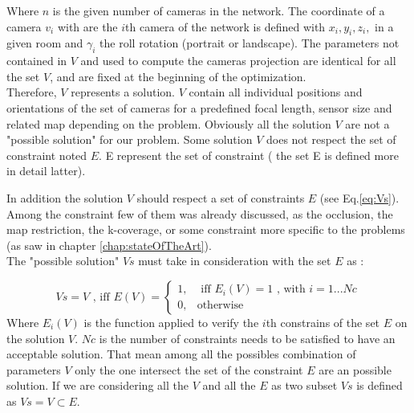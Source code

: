 \noindent Where $n$ is the given number of cameras in the network. The coordinate of a camera $v_i$ with are the $i$th camera of the network is defined  with $x_i, y_i, z_i,$ in a given room and $\gamma_i$ the roll rotation (portrait or landscape). The parameters not contained in $V$ and used to compute the cameras projection are  identical for all the set $V$, and are fixed at the beginning of the optimization.\\
Therefore, $V$ represents a solution. $V$ contain all individual positions and orientations of the set of cameras for a predefined focal length, sensor size and related map depending on the problem.%
 Obviously all the solution $V$ are not a "possible solution" for our problem. Some solution $V$ does not respect the set of constraint noted $E$. E represent the set of constraint ( the set E is defined  more in detail latter). 

In addition the solution $V$ should respect a set of constraints  $E$ (see Eq.\ref{eq:Vs}). Among the constraint few of them was already discussed, as the occlusion, the map restriction, the k-coverage, or some constraint more specific to the problems (as saw in chapter \ref{chap:stateOfTheArt}).\\
 The "possible solution" $Vs$ must take in consideration with the set $E$ as :

\begin{equation}\label{eq:Vs}
Vs=V \mbox{ , iff } E(V)=\begin{cases} 1, & \mbox{  iff } E_i(V)=1 \mbox{ , with } i=1...Nc \\ 0, & \mbox{otherwise} 
\end{cases} 
\end{equation}
Where $E_i(V)$ is the function applied to verify  the $i$th constrains of the set $E$ on the solution $V$. $Nc$ is the number of constraints needs to be satisfied to have an acceptable solution.
That mean among all the possibles combination of parameters $V$ only the one intersect the set of the constraint $E$ are an possible solution.  If we are considering  all the $V$ and all the $E$ as two subset $Vs$ is defined as $Vs=V\subset E$. 

